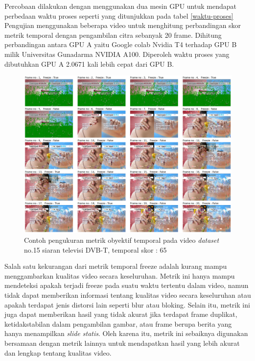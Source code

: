 Percobaan dilakukan dengan menggunakan dua mesin GPU untuk mendapat perbedaan waktu proses seperti yang ditunjukkan pada tabel \ref{waktu-proses} Pengujian menggunakan beberapa video untuk menghitung perbandingan skor metrik temporal dengan pengambilan citra sebanyak 20 frame. Dihitung perbandingan antara GPU A yaitu Google colab Nvidia T4 terhadap GPU B milik Universitas Gunadarma NVIDIA A100. Diperoleh waktu proses yang dibutuhkan GPU A 2.0671 kali lebih cepat  dari GPU B.


\begin{figure}[H]
	\vspace{-0.1cm}
	\begin{center}
		\includegraphics[width=1\columnwidth]{bab4/Gambar/sample-freeze3.png}
	\end{center}
	\vspace{-0.2cm}
	\caption{Contoh pengukuran metrik obyektif  temporal pada video \textit{dataset} no.15 siaran televisi DVB-T, temporal skor : 65}
	\label{sample-freeze3}
\end{figure}

Salah satu kekurangan dari metrik temporal freeze adalah kurang mampu menggambarkan kualitas video secara keseluruhan. Metrik ini hanya mampu mendeteksi apakah terjadi freeze pada suatu waktu tertentu dalam video, namun tidak dapat memberikan informasi tentang kualitas video secara keseluruhan atau apakah terdapat jenis distorsi lain seperti blur atau bloking. Selain itu, metrik ini juga dapat memberikan hasil yang tidak akurat jika terdapat frame duplikat, ketidakstabilan dalam pengambilan gambar, atau frame berupa berita yang hanya menampilkan \textit{slide statis}. Oleh karena itu, metrik ini sebaiknya digunakan bersamaan dengan metrik lainnya untuk mendapatkan hasil yang lebih akurat dan lengkap tentang kualitas video. 


